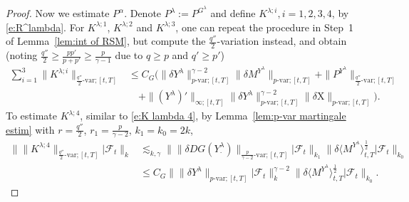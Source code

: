 \documentclass[11pt,reqno]{amsart}
\numberwithin{equation}{section}
\begin{document}
\begin{proof}
Now we estimate $P^{\alpha}$. Denote $P^{\lambda} := P^{G^{\lambda}}$ and define $K^{\lambda;i}, i=1,2,3,4$, by \eqref{e:R^lambda}. For $K^{\lambda;1}$, $K^{\lambda;2}$ and $K^{\lambda;3}$, one can repeat the procedure in Step~1 of Lemma~\ref{lem:int of RSM}, but compute the $\frac{q''}{2}$-variation instead, and obtain (noting $\frac{q''}{2} \ge \frac{pp'}{p+p'} \ge \frac{p}{\gamma - 1}$ due to $q \ge p$ and $q' \ge p'$)
\begin{equation}\label{e:K1+K2+K3}
\begin{aligned}
\sum_{i=1}^{3}\|K^{\lambda;i}\|_{\frac{q''}{2}\text{-}\mathrm{var};[t,T]} &\le C_G \Big( \|\delta Y^{\lambda}\|^{\gamma - 2}_{p\text{-}\mathrm{var};[t,T]} \|\delta M^{Y^{\lambda}}\|_{p\text{-}\mathrm{var};[t,T]} + \|P^{Y^{\lambda}}\|_{\frac{q''}{2}\text{-}\mathrm{var};[t,T]} \\
&\quad + \|(Y^{\lambda})'\|_{\infty;[t,T]} \|\delta Y^{\lambda}\|^{\gamma - 2}_{p\text{-}\mathrm{var};[t,T]} \|\delta \mathrm X\|_{p\text{-}\mathrm{var};[t,T]} \Big).
\end{aligned}
\end{equation}
To estimate $K^{\lambda;4}$, similar to \eqref{e:K lambda 4}, by Lemma~\ref{lem:p-var martingale estim} with $r = \frac{q''}{2}$, $r_1 = \frac{p}{\gamma - 2}$, $k_1 = k_0 = 2k$, 
\begin{equation}\label{e:K lambda 4'}
\begin{aligned}
\big\| \| K^{\lambda;4} \|_{\frac{q''}{2}\text{-}\mathrm{var};[t,T]}  \big| \mathcal F_{t}\big\|_{k} & \lesssim_{k,\gamma} \big\| \|\delta DG(Y^{\lambda}_{\bm\cdot})\|_{\frac{p}{\gamma - 2}\text{-}\mathrm{var};[t,T]} \big| \mathcal F_{t} \big\|_{k_1} \big\| \delta \langle M^{Y^{\lambda}} \rangle^{\frac{1}{2}}_{t,T} \big| \mathcal F_{t} \big\|_{k_0} \\
&\le C_G \big\| \|\delta Y^{\lambda}\|_{p\text{-}\mathrm{var};[t,T]} \big| \mathcal F_t \big\|^{\gamma - 2}_{k} \big\| \delta \langle M^{Y^{\lambda}} \rangle^{\frac{1}{2}}_{t,T} \big| \mathcal F_{t} \big\|_{k_0}. 
\end{aligned}
\end{equation}  


\end{proof}
\end{document}
